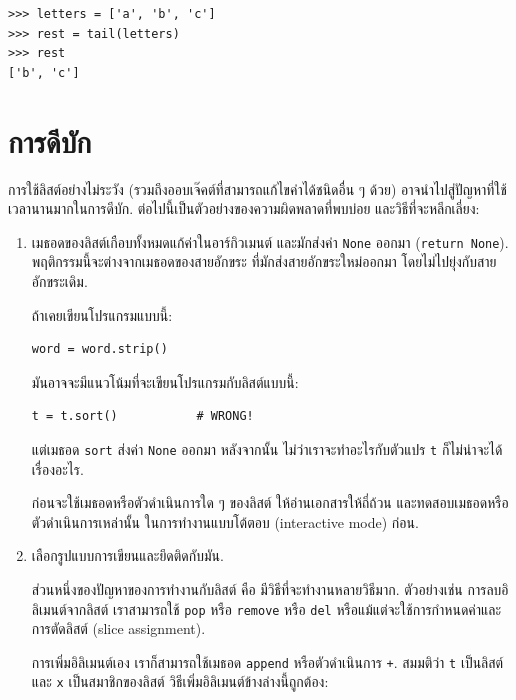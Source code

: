 \begin{verbatim}
>>> letters = ['a', 'b', 'c']
>>> rest = tail(letters)
>>> rest
['b', 'c']
\end{verbatim}



\section{การดีบัก}

การใช้ลิสต์อย่างไม่ระวัง (รวมถึงออบเจ๊คต์ที่สามารถแก้ไขค่าได้ชนิดอื่น ๆ ด้วย)
อาจนำไปสู่ปัญหาที่ใช้เวลานานมากในการดีบัก.
ต่อไปนี้เป็นตัวอย่างของความผิดพลาดที่พบบ่อย และวิธีที่จะหลีกเลี่ยง:

\begin{enumerate}

\item เมธอดของลิสต์เกือบทั้งหมดแก้ค่าในอาร์กิวเมนต์ และมักส่งค่า \texttt{None} ออกมา (\texttt{return None}).
พฤติกรรมนี้จะต่างจากเมธอดของสายอักขระ ที่มักส่งสายอักขระใหม่ออกมา โดยไม่ไปยุ่งกับสายอักขระเดิม.

ถ้าเคยเขียนโปรแกรมแบบนี้:

\begin{verbatim}
word = word.strip()
\end{verbatim}

มันอาจจะมีแนวโน้มที่จะเขียนโปรแกรมกับลิสต์แบบนี้:

\begin{verbatim}
t = t.sort()           # WRONG!
\end{verbatim}

แต่เมธอด \texttt{sort} ส่งค่า \texttt{None} ออกมา
หลังจากนั้น ไม่ว่าเราจะทำอะไรกับตัวแปร \texttt{t} ก็ไม่น่าจะได้เรื่องอะไร.

ก่อนจะใช้เมธอดหรือตัวดำเนินการใด ๆ ของลิสต์
ให้อ่านเอกสารให้ถี่ถ้วน และทดสอบเมธอดหรือตัวดำเนินการเหล่านั้น ในการทำงานแบบโต้ตอบ (interactive mode) ก่อน.

\item เลือกรูปแบบการเขียนและยึดติดกับมัน.

ส่วนหนึ่งของปัญหาของการทำงานกับลิสต์ คือ มีวิธีที่จะทำงานหลายวิธีมาก.
ตัวอย่างเช่น การลบอิลิเมนต์จากลิสต์ เราสามารถใช้ \texttt{pop} หรือ \texttt{remove} หรือ \texttt{del} หรือแม้แต่จะใช้การกำหนดค่าและการตัดลิสต์ (slice assignment).

การเพิ่มอิลิเมนต์เอง เราก็สามารถใช้เมธอด \texttt{append} หรือตัวดำเนินการ \texttt{+}. 
สมมติว่า \texttt{t} เป็นลิสต์และ
\texttt{x} เป็นสมาชิกของลิสต์
วิธีเพิ่มอิลิเมนต์ข้างล่างนี้ถูกต้อง: 


\end{enumerate}
